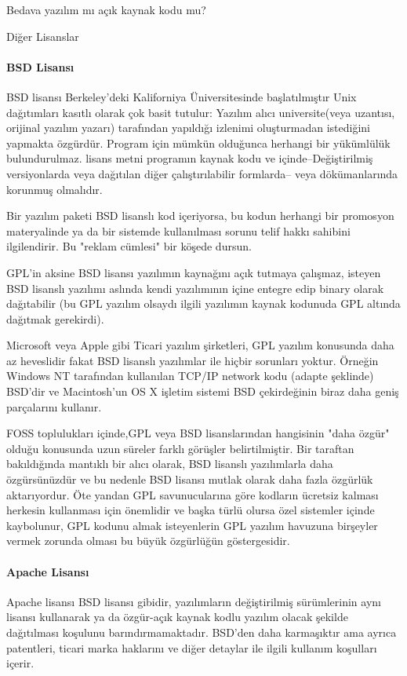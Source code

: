 \begin{section}{Bedava yazılım mı açık kaynak kodu mu?}
\begin{subsection}{Diğer Lisanslar}
\paragraph{BSD Lisansı}{BSD lisansı Berkeley'deki Kaliforniya Üniversitesinde başlatılmıştır Unix dağıtımları kasıtlı olarak çok basit tutulur: Yazılım alıcı universite(veya uzantısı, orijinal yazılım yazarı)  tarafından yapıldığı izlenimi oluşturmadan istediğini yapmakta özgürdür. Program için mümkün olduğunca herhangi bir yükümlülük bulundurulmaz. lisans metni programın kaynak kodu ve içinde--Değiştirilmiş versiyonlarda veya dağıtılan diğer çalıştırılabilir formlarda-- veya dökümanlarında korunmuş olmalıdır.}

Bir yazılım paketi BSD lisanslı kod içeriyorsa, bu kodun herhangi bir promosyon materyalinde ya da bir sistemde kullanılması sorunu  telif hakkı sahibini ilgilendirir. Bu "reklam cümlesi" bir köşede dursun.

GPL'in aksine BSD lisansı yazılımın kaynağını açık tutmaya çalışmaz, isteyen  BSD lisanslı yazılımı aslında kendi yazılımının içine entegre edip binary olarak dağıtabilir (bu GPL yazılım olsaydı ilgili yazılımın kaynak kodunuda GPL altında dağıtmak gerekirdi).

Microsoft veya Apple gibi Ticari yazılım şirketleri, GPL yazılım konusunda daha az heveslidir fakat BSD lisanslı yazılımlar  ile hiçbir sorunları yoktur. Örneğin Windows NT tarafından kullanılan TCP/IP network kodu (adapte şeklinde) BSD'dir ve Macintosh'un OS X işletim sistemi BSD çekirdeğinin biraz daha geniş parçalarını kullanır.

FOSS toplulukları içinde,GPL veya BSD lisanslarından hangisinin "daha özgür" olduğu konusunda uzun süreler farklı görüşler belirtilmiştir. Bir taraftan bakıldığında mantıklı bir alıcı olarak, BSD lisanslı yazılımlarla daha özgürsünüzdür ve bu nedenle BSD lisansı mutlak olarak daha fazla özgürlük aktarıyordur. Öte yandan GPL savunucularına göre kodların ücretsiz kalması herkesin kullanması için önemlidir ve başka türlü olursa özel sistemler içinde kaybolunur, GPL kodunu almak isteyenlerin GPL yazılım havuzuna birşeyler vermek zorunda olması bu büyük özgürlüğün göstergesidir.

\paragraph{Apache Lisansı}{Apache lisansı BSD lisansı gibidir, yazılımların değiştirilmiş sürümlerinin aynı lisansı kullanarak ya da özgür-açık kaynak kodlu yazılım olacak şekilde dağıtılması koşulunu barındırmamaktadır. BSD'den daha karmaşıktır ama ayrıca patentleri, ticari marka haklarını ve diğer detaylar ile ilgili kullanım koşulları içerir.}

\end{subsection}
\end{section}
